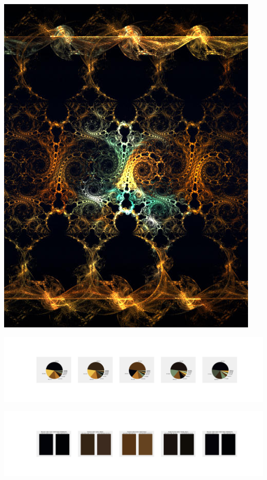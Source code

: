 \documentclass[11pt]{article}
\begin{document}
\begin{landscape}
    \begin{center}
    \includegraphics[width=\textwidth]{./nbimg/file (23).jpg}
    \end{center}

    \begin{center}
    \includegraphics[width=250mm]{./nbimg/pie-145.jpg}
    \end{center}

    \begin{center}
    \includegraphics[width=250mm]{./nbimg/peak-145.jpg}
    \end{center}
    


\end{landscape}
\end{document}
